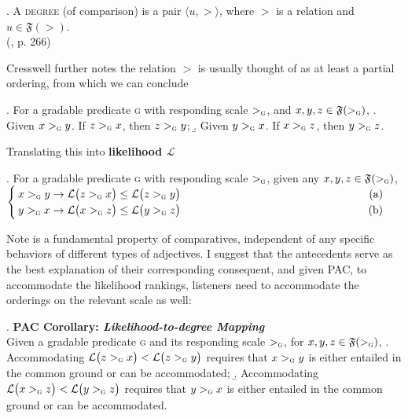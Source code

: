 \documentclass[12pt,letterpaper]{scrartcl}
\newcommand{\alignright}{\hspace*{\fill}}
\newcommand{\lreqn}[2]{\noindent\makebox[.965\linewidth]{$\displaystyle#1$\hfill(#2)}\vspace{0ex}}
\begin{document}
\ex. A \textsc{degree} (of comparison) is a pair $\big \langle u, > \big \rangle$, where $>$ is a relation and $u \in \mathfrak{F}(>)$. \\ \alignright (\cite{cresswell_semantics_1976}, p. 266)

Cresswell further notes the relation $>$ is usually thought of as at least a partial ordering, from which we can conclude

\ex. For a gradable predicate \textsc{g} with responding scale $>_\textsc{g}$, and $x, y, z \in \mathfrak{F}(>_\textsc{g})$,
\a. Given $ x >_\textsc{g} y$. If $z >_\textsc{g} x$, then $z >_\textsc{g} y$;
\b. Given $ y >_\textsc{g} x$. If $x >_\textsc{g} z$, then $y >_\textsc{g} z$.

Translating this into \textbf{likelihood $\mathcal{L}$}

\ex. For a gradable predicate \textsc{g} with responding scale $>_\textsc{g}$, given any $x, y, z \in \mathfrak{F}(>_\textsc{g})$, \\ \vspace{0.25cm}
$
\begin{cases}
    \lreqn{x >_\textsc{g} y \to \mathcal{L}\big( z >_\textsc{g} x \big) \leq \mathcal{L}\big( z >_\textsc{g} y\big)}{a} \\
    \lreqn{y >_\textsc{g} x \to \mathcal{L}\big( x >_\textsc{g} z \big) \leq \mathcal{L}\big( y >_\textsc{g} z\big)}{b}
\end{cases}
$

Note \Last is a fundamental property of comparatives, independent of any specific behaviors of different types of adjectives. I suggest that the antecedents serve as the best explanation of their corresponding consequent, and given PAC, to accommodate the likelihood rankings, listeners need to accommodate the orderings on the relevant scale as well:

\ex. \textbf{PAC Corollary: \textit{Likelihood-to-degree Mapping}} \\ 
Given a gradable predicate \textsc{g} and its responding scale $>_\textsc{g}$, for $x, y, z \in \mathfrak{F}(>_\textsc{g})$, 
\a. Accommodating $\mathcal{L}\big( z >_\textsc{g} x \big) < \mathcal{L}\big( z >_\textsc{g} y\big)$ requires that $x >_\textsc{g} y$ is either entailed in the common ground or can be accommodated;
\b. Accommodating $\mathcal{L}\big( x >_\textsc{g} z \big) < \mathcal{L}\big( y >_\textsc{g} z\big)$ requires that $y >_\textsc{g} x$ is either entailed in the common ground or can be accommodated.
\end{document}
